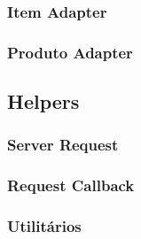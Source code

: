 \subsubsection{Item Adapter}

\subsubsection{Produto Adapter}


\subsection{Helpers}

\subsubsection{Server Request}

\subsubsection{Request Callback}

\subsubsection{Utilitários}
